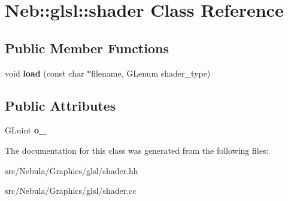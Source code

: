 \hypertarget{classNeb_1_1glsl_1_1shader}{\section{\-Neb\-:\-:glsl\-:\-:shader \-Class \-Reference}
\label{classNeb_1_1glsl_1_1shader}
}
\subsection*{\-Public \-Member \-Functions}
\begin{DoxyCompactItemize}
\item 
\hypertarget{classNeb_1_1glsl_1_1shader_aa0ae036b0adc5c8e21e87e1120bc813d}{void {\bfseries load} (const char $\ast$filename, \-G\-Lenum shader\-\_\-type)}\label{classNeb_1_1glsl_1_1shader_aa0ae036b0adc5c8e21e87e1120bc813d}

\end{DoxyCompactItemize}
\subsection*{\-Public \-Attributes}
\begin{DoxyCompactItemize}
\item 
\hypertarget{classNeb_1_1glsl_1_1shader_ac24c1c0ce93ef83fb0fa36862d003993}{\-G\-Luint {\bfseries o\-\_\-}}\label{classNeb_1_1glsl_1_1shader_ac24c1c0ce93ef83fb0fa36862d003993}

\end{DoxyCompactItemize}


\-The documentation for this class was generated from the following files\-:\begin{DoxyCompactItemize}
\item 
src/\-Nebula/\-Graphics/glsl/shader.\-hh\item 
src/\-Nebula/\-Graphics/glsl/shader.\-cc\end{DoxyCompactItemize}
